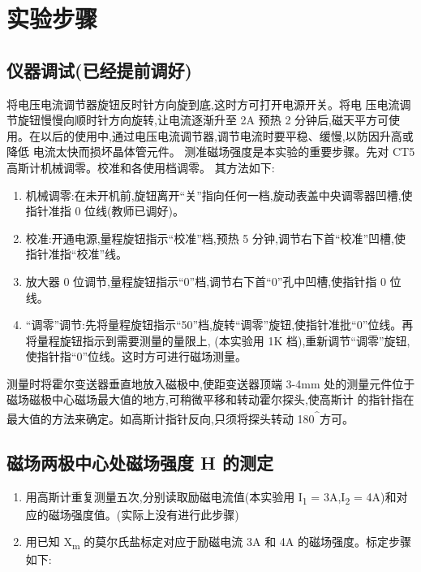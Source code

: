 \documentclass[11pt]{report}
\begin{document}
\chapter{实验步骤}
\label{sec:org19e38f1}
\section{仪器调试(已经提前调好)}
\label{sec:org3ee9441}
    将电压电流调节器旋钮反时针方向旋到底,这时方可打开电源开关。将电
压电流调节旋钮慢慢向顺时针方向旋转,让电流逐渐升至 2A 预热 2 分钟后,磁天平方可使
用。在以后的使用中,通过电压电流调节器,调节电流时要平稳、缓慢,以防因升高或降低
电流太快而损坏晶体管元件。
测准磁场强度是本实验的重要步骤。先对 CT5 高斯计机械调零。校准和各使用档调零。
其方法如下:
\begin{enumerate}
\item 机械调零:在未开机前,旋钮离开“关”指向任何一档,旋动表盖中央调零器凹槽,使指针准指 0 位线(教师已调好)。
\item 校准:开通电源,量程旋钮指示“校准”档,预热 5 分钟,调节右下首“校准”凹槽,使指针准指“校准”线。
\item 放大器 0 位调节,量程旋钮指示“0”档,调节右下首“0”孔中凹槽,使指针指 0 位线。
\item “调零”调节:先将量程旋钮指示“50”档,旋转“调零”旋钮,使指针准批“0”位线。再将量程旋钮指示到需要测量的量限上, (本实验用 1K 档),重新调节“调零”旋钮,使指针指“0”位线。这时方可进行磁场测量。
\end{enumerate}

测量时将霍尔变送器垂直地放入磁极中,使距变送器顶端 3-4mm
处的测量元件位于磁场磁极中心磁场最大值的地方,可稍微平移和转动霍尔探头,使高斯计
的指针指在最大值的方法来确定。如高斯计指针反向,只须将探头转动 180\textsuperscript{\^{}}方可。

\section{磁场两极中心处磁场强度 H 的测定}
\label{sec:org2d03d0b}
\begin{enumerate}
\item 用高斯计重复测量五次,分别读取励磁电流值(本实验用 I\textsubscript{1} = 3A,I\textsubscript{2} = 4A)和对应的磁场强度值。(实际上没有进行此步骤)

\item 用已知 X\textsubscript{m} 的莫尔氏盐标定对应于励磁电流 3A 和 4A 的磁场强度。标定步骤如下:
\end{enumerate}
\end{document}
